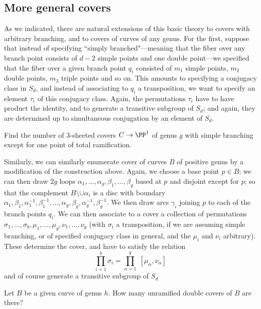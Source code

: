 \subsection{More general covers}\label{general covers}

As we indicated, there are natural extensions of this basic theory to covers with arbitrary branching, and to covers of curves of any genus. For the first, suppose that instead of specifying ``simply branched"---meaning that the fiber over any branch point consists of $d-2$ simple points and one double point---we specified that the fiber over a given branch point $q_i$ consisted of $m_1$ simple points, $m_2$ double points, $m_3$ triple points and so on. This amounts to specifying a conjugacy class in $S_d$, and instead of associating to $q_i$ a transposition, we want to specify an element $\tau_i$ of this conjugacy class. Again, the permutations $\tau_i$ have to have product the identity, and to generate a transitive subgroup of $S_d$; and again, they are determined up to simultaneous conjugation by an element of $S_d$.

\begin{exercise}
Find the number of 3-sheeted covers $C \to \PP^1$ of genus $g$ with simple branching except for one point of total ramification.
\end{exercise}

Similarly, we can similarly enumerate cover of curves $B$ of positive genus by a modification of the construction above. Again, we choose a base point $p \in B$; we can then draw $2g$ loops $\alpha_1,\dots,\alpha_{g},\beta_1, \dots, \beta_g$ based at $p$ and disjoint except for $p$; so that the complement $B \setminus \cup \alpha_i$ is a disc with boundary $\alpha_1, \beta_1, \alpha_1^{-1}, \beta_1^{-1}, \dots, \alpha_g, \beta_g, \alpha_g^{-1}, \beta_g^{-1}$. We then draw arcs $\gamma_i$ joining $p$ to each of the branch points $q_i$. We can then associate to a cover a collection of permutations $\sigma_1, \dots, \sigma_b, \mu_1,\dots,\mu_g, \nu_1,\dots,\nu_g$ (with $\sigma_i$ a transposition, if we are assuming simple branching, or of specified conjugacy class in general, and the $\mu_i$ and $\nu_i$ arbitrary). These determine the cover, and have to satisfy the relation
$$
\prod_{i=1}^b \sigma_i = \prod_{\alpha=1}^g \; [\mu_\alpha, \nu_\alpha]
$$
and of course generate a transitive subgroup of $S_d$

\begin{exercise}
Let $B$ be a given curve of genus $h$. How many unramified double covers of $B$ are there? 
\end{exercise}


